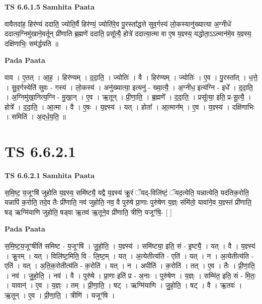 \documentclass[17pt]{extarticle}
\begin{document}
\textbf{TS 6.6.1.5 } \newline
\textbf{Samhita Paata} \newline

वावैतदा॑ह॒ हिर॑ण्यं ददाति॒ ज्योति॒र्वै हिर॑ण्यं॒ ज्योति॑रे॒व पु॒रस्ता᳚द्धत्ते सुव॒र्गस्य॑ लो॒कस्यानु॑ख्यात्या अ॒ग्नीधे॑ ददात्य॒ग्निमु॑खाने॒वर्तून् प्री॑णाति ब्र॒ह्मणे॑ ददाति॒ प्रसू᳚त्यै॒ होत्रे॑ ददात्या॒त्मा वा ए॒ष य॒ज्ञ्स्य॒ यद्धोता॒ऽऽत्मान॑मे॒व य॒ज्ञ्स्य॒ दक्षि॑णाभिः॒ सम॑र्द्धयति ॥ \newline

\textbf{Pada Paata} \newline

वाव । ए॒तत् । आ॒ह॒ । हिर॑ण्यम् । द॒दा॒ति॒ । ज्योतिः॑ । वै । हिर॑ण्यम् । ज्योतिः॑ । ए॒व । पु॒रस्ता᳚त् । ध॒त्ते॒ । सु॒व॒र्गस्येति॑ सुवः - गस्य॑ । लो॒कस्य॑ । अनु॑ख्यात्या॒ इत्यनु॑ - ख्या॒त्यै॒ । अ॒ग्नीध॒ इत्य॑ग्नि - इधे᳚ । द॒दा॒ति॒ । अ॒ग्निमु॑खा॒नित्य॒ग्नि - मु॒खा॒न् । ए॒व । ऋ॒तून् । प्री॒णा॒ति॒ । ब्र॒ह्मणे᳚ । द॒दा॒ति॒ । प्रसू᳚त्या॒ इति॒ प्र-सू॒त्यै॒ । होत्रे᳚ । द॒दा॒ति॒ । आ॒त्मा । वै । ए॒षः । य॒ज्ञ्स्य॑ । यत् । होता᳚ । आ॒त्मान᳚म् । ए॒व । य॒ज्ञ्स्य॑ । दक्षि॑णाभिः । समिति॑ । अ॒द्‌र्ध॒य॒ति॒ ॥  \newline





\section{ TS 6.6.2.1 }

\textbf{TS 6.6.2.1 } \newline
\textbf{Samhita Paata} \newline

स॒मि॒ष्ट॒ य॒जूꣳषि॑ जुहोति य॒ज्ञ्स्य॒ समि॑ष्ट्यै॒ यद्वै य॒ज्ञ्स्य॑ क्रू॒रं ॅयद्-विलि॑ष्टं॒ ॅयद॒त्येति॒ यन्नात्येति॒ यद॑तिक॒रोति॒ यन्नापि॑ क॒रोति॒ तदे॒व तैः प्री॑णाति॒ नव॑ जुहोति॒ नव॒ वै पुरु॑षे प्रा॒णाः पुरु॑षेण य॒ज्ञ्ः संमि॑तो॒ यावा॑ने॒व य॒ज्ञ्स्तं प्री॑णाति॒ षड् ऋग्मि॑याणि जुहोति॒ षड्वा ऋ॒तव॑ ऋ॒तूने॒व प्री॑णाति॒ त्रीणि॒ यजूꣳ॑षि॒- [  ] \newline

\textbf{Pada Paata} \newline

स॒मि॒ष्ट॒य॒जूꣳषीति॑ समिष्ट - य॒जूꣳषि॑ । जु॒हो॒ति॒ । य॒ज्ञ्स्य॑ । समि॑ष्ट्या॒ इति॒ सं - इ॒ष्ट्यै॒ । यत् । वै । य॒ज्ञ्स्य॑ । क्रू॒रम् । यत् । विलि॑ष्ट॒मिति॒ वि - लि॒ष्ट॒म् । यत् । अ॒त्येतीत्य॑ति - एति॑ । यत् । न । अ॒त्येतीत्य॑ति - एति॑ । यत् । अ॒ति॒क॒रोतीत्य॑ति - क॒रोति॑ । यत् । न । अपीति॑ । क॒रोति॑ । तत् । ए॒व । तैः । प्री॒णा॒ति॒ । नव॑ । जु॒हो॒ति॒ । नव॑ । वै । पुरु॑षे । प्रा॒णा इति॑ प्र - अ॒नाः । पुरु॑षेण । य॒ज्ञ्ः । सम्मि॑त॒ इति॒ सं - मि॒तः॒ । यावान्॑ । ए॒व । य॒ज्ञ्ः । तम् । प्री॒णा॒ति॒ । षट् । ऋग्मि॑याणि । जु॒हो॒ति॒ । षट् । वै । ऋ॒तवः॑ । ऋ॒तून् । ए॒व । प्री॒णा॒ति॒ । त्रीणि॑ । यजूꣳ॑षि ।  \newline
\end{document}
